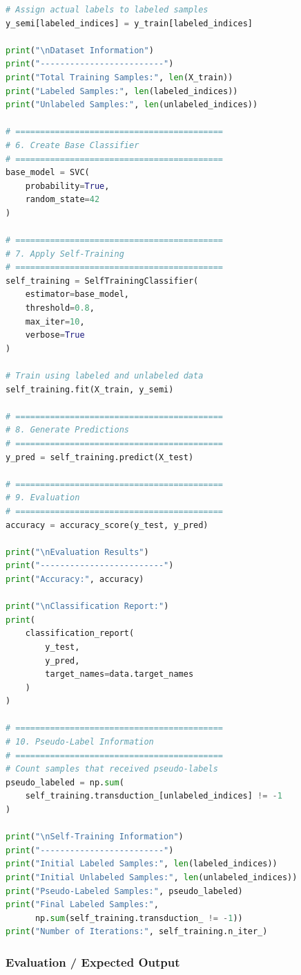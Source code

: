 \documentclass[a4paper,11pt]{article}
\begin{document}
\begin{lstlisting}[language=Python, caption={Self-Training Implementation}]
# Assign actual labels to labeled samples
y_semi[labeled_indices] = y_train[labeled_indices]

print("\nDataset Information")
print("-------------------------")
print("Total Training Samples:", len(X_train))
print("Labeled Samples:", len(labeled_indices))
print("Unlabeled Samples:", len(unlabeled_indices))

# ==========================================
# 6. Create Base Classifier
# ==========================================
base_model = SVC(
    probability=True,
    random_state=42
)

# ==========================================
# 7. Apply Self-Training
# ==========================================
self_training = SelfTrainingClassifier(
    estimator=base_model,
    threshold=0.8,
    max_iter=10,
    verbose=True
)

# Train using labeled and unlabeled data
self_training.fit(X_train, y_semi)

# ==========================================
# 8. Generate Predictions
# ==========================================
y_pred = self_training.predict(X_test)

# ==========================================
# 9. Evaluation
# ==========================================
accuracy = accuracy_score(y_test, y_pred)

print("\nEvaluation Results")
print("-------------------------")
print("Accuracy:", accuracy)

print("\nClassification Report:")
print(
    classification_report(
        y_test,
        y_pred,
        target_names=data.target_names
    )
)

# ==========================================
# 10. Pseudo-Label Information
# ==========================================
# Count samples that received pseudo-labels
pseudo_labeled = np.sum(
    self_training.transduction_[unlabeled_indices] != -1
)

print("\nSelf-Training Information")
print("-------------------------")
print("Initial Labeled Samples:", len(labeled_indices))
print("Initial Unlabeled Samples:", len(unlabeled_indices))
print("Pseudo-Labeled Samples:", pseudo_labeled)
print("Final Labeled Samples:",
      np.sum(self_training.transduction_ != -1))
print("Number of Iterations:", self_training.n_iter_)
\end{lstlisting}

\subsubsection{Evaluation / Expected Output}
\end{document}
